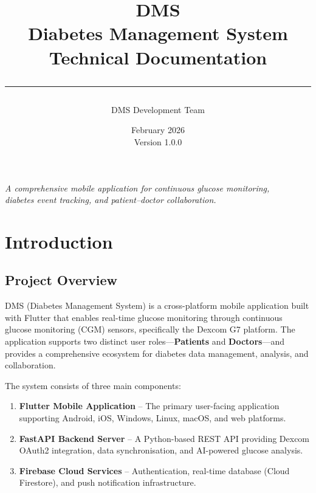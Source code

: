 \documentclass[12pt,a4paper]{article}
\title{
    \vspace{-1cm}
    {\Huge\bfseries DMS}\\[0.3cm]
    {\LARGE Diabetes Management System}\\[0.5cm]
    {\large Technical Documentation}\\[0.3cm]
    \rule{\textwidth}{0.4pt}
}
\author{DMS Development Team}
\date{February 2026 \\ Version 1.0.0}
\begin{document}

\maketitle
\thispagestyle{empty}

\vfill
\begin{center}
\textit{A comprehensive mobile application for continuous glucose monitoring,\\
diabetes event tracking, and patient--doctor collaboration.}
\end{center}
\vfill

\clearpage
\tableofcontents
\clearpage

\section{Introduction}

\subsection{Project Overview}

DMS (Diabetes Management System) is a cross-platform mobile application built with Flutter that enables real-time glucose monitoring through continuous glucose monitoring (CGM) sensors, specifically the Dexcom G7 platform. The application supports two distinct user roles---\textbf{Patients} and \textbf{Doctors}---and provides a comprehensive ecosystem for diabetes data management, analysis, and collaboration.

The system consists of three main components:
\begin{enumerate}
    \item \textbf{Flutter Mobile Application} -- The primary user-facing application supporting Android, iOS, Windows, Linux, macOS, and web platforms.
    \item \textbf{FastAPI Backend Server} -- A Python-based REST API providing Dexcom OAuth2 integration, data synchronisation, and AI-powered glucose analysis.
    \item \textbf{Firebase Cloud Services} -- Authentication, real-time database (Cloud Firestore), and push notification infrastructure.
\end{enumerate}
\end{document}
